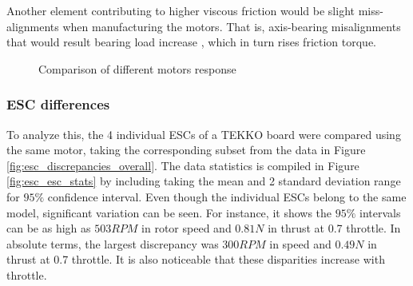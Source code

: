 Another element contributing to higher viscous friction would be slight miss-alignments when manufacturing the motors. That is, axis-bearing misalignments that would result bearing load increase , which in turn rises friction torque.

\begin{figure}[!tbp]
  \centering
  \caption{Comparison of different motors response}
  \label{fig:mot_discr}
\end{figure}


\subsubsection{ESC differences}
To analyze this, the 4 individual ESCs of a TEKKO board were compared using the same motor, taking the corresponding subset from the data in Figure \ref{fig:esc_discrepancies_overall}. The data statistics is compiled in Figure \ref{fig:esc_esc_stats} by including taking the mean and 2 standard deviation range for $95\%$ confidence interval. Even though the individual ESCs belong to the same model, significant variation can be seen. For instance, it shows the $95\%$ intervals can be as high as $503RPM$ in rotor speed and $0.81N$ in thrust at 0.7 throttle. In 
absolute terms, the largest discrepancy was  $300RPM$ in speed and $0.49N$ in thrust at 0.7 throttle. It is also noticeable that these disparities increase with throttle. 


